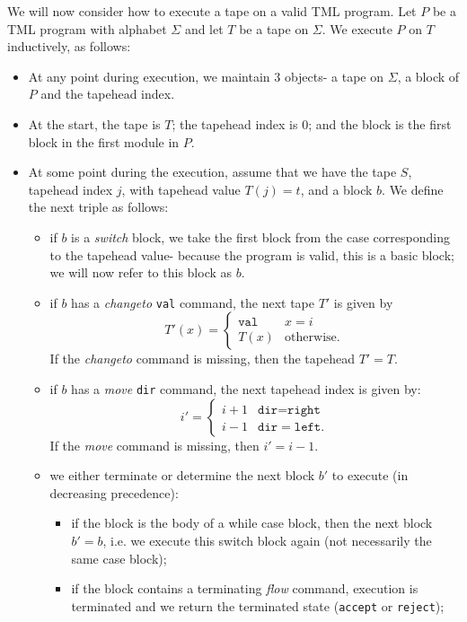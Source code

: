 \begin{appendices}
We will now consider how to execute a tape on a valid TML program. Let $P$ be a TML program with alphabet $\Sigma$ and let $T$ be a tape on $\Sigma$. We execute $P$ on $T$ inductively, as follows:
\begin{itemize}
    \item At any point during execution, we maintain 3 objects- a tape on $\Sigma$, a block of $P$ and the tapehead index. 
    \item At the start, the tape is $T$; the tapehead index is $0$; and the block is the first block in the first module in $P$. 
    \item At some point during the execution, assume that we have the tape $S$, tapehead index $j$, with tapehead value $T(j) = t$, and a block $b$. We define the next triple as follows:
    \begin{itemize}
        \item if $b$ is a \textit{switch} block, we take the first block from the case corresponding to the tapehead value- because the program is valid, this is a basic block; we will now refer to this block as $b$.
        \item if $b$ has a \textit{changeto} \texttt{val} command, the next tape $T'$ is given by 
        \[T'(x) = \begin{cases}
            \texttt{val} & x = i \\
            T(x) & \text{otherwise}.
        \end{cases}\]
        If the \textit{changeto} command is missing, then the tapehead $T' = T$.
        \item if $b$ has a \textit{move} \texttt{dir} command, the next tapehead index is given by:
        \[i' = \begin{cases}
            i+1 & \texttt{dir} = \texttt{right} \\
            i-1 & \texttt{dir} = \texttt{left}.
        \end{cases}\]
        If the \textit{move} command is missing, then $i' = i-1$.
        \item we either terminate or determine the next block $b'$ to execute (in decreasing precedence):
        \begin{itemize}
            \item if the block is the body of a while case block, then the next block $b' = b$, i.e. we execute this switch block again (not necessarily the same case block);
            \item if the block contains a terminating \textit{flow} command, execution is terminated and we return the terminated state (\texttt{accept} or \texttt{reject});

\end{itemize}
\end{itemize}
\end{itemize}
\end{appendices}
